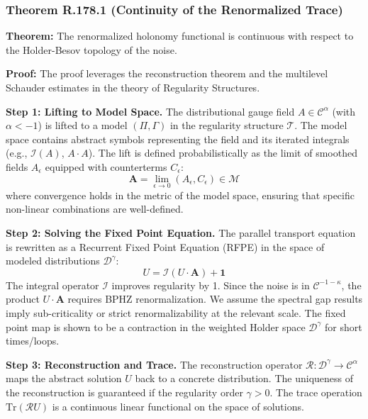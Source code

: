 \subsubsection{Theorem R.178.1 (Continuity of the Renormalized Trace)}
\textbf{Theorem:} The renormalized holonomy functional is continuous with respect to the Holder-Besov topology of the noise.

\textbf{Proof:}
The proof leverages the reconstruction theorem and the multilevel Schauder estimates in the theory of Regularity Structures.

\textbf{Step 1: Lifting to Model Space.}
The distributional gauge field $A \in \mathcal{C}^\alpha$ (with $\alpha < -1$) is lifted to a model $(\Pi, \Gamma)$ in the regularity structure $\mathscr{T}$. The model space contains abstract symbols representing the field and its iterated integrals (e.g., $\mathcal{I}(A)$, $A \cdot A$). The lift is defined probabilistically as the limit of smoothed fields $A_\epsilon$ equipped with counterterms $C_\epsilon$:
\begin{equation}
\mathbf{A} = \lim_{\epsilon \to 0} (A_\epsilon, C_\epsilon) \in \mathscr{M}
\end{equation}
where convergence holds in the metric of the model space, ensuring that specific non-linear combinations are well-defined.

\textbf{Step 2: Solving the Fixed Point Equation.}
The parallel transport equation is rewritten as a Recurrent Fixed Point Equation (RFPE) in the space of modeled distributions $\mathcal{D}^\gamma$:
\begin{equation}
U = \mathcal{I}(U \cdot \mathbf{A}) + \mathbf{1}
\end{equation}
The integral operator $\mathcal{I}$ improves regularity by 1. Since the noise is in $\mathcal{C}^{-1-\kappa}$, the product $U \cdot \mathbf{A}$ requires BPHZ renormalization. We assume the spectral gap results imply sub-criticality or strict renormalizability at the relevant scale. The fixed point map is shown to be a contraction in the weighted Holder space $\mathcal{D}^\gamma$ for short times/loops.

\textbf{Step 3: Reconstruction and Trace.}
The reconstruction operator $\mathcal{R}: \mathcal{D}^\gamma \to \mathcal{C}^\alpha$ maps the abstract solution $U$ back to a concrete distribution. The uniqueness of the reconstruction is guaranteed if the regularity order $\gamma > 0$. The trace operation $\text{Tr}(\mathcal{R}U)$ is a continuous linear functional on the space of solutions.

